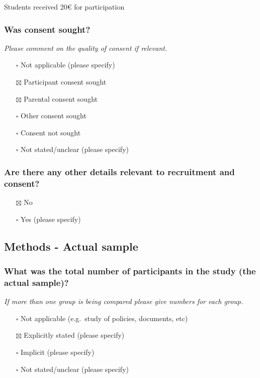\documentclass[
  doc, a4paper]{apa7}
\providecommand{\tightlist}{%
  \setlength{\itemsep}{0pt}\setlength{\parskip}{0pt}}
\begin{document}
Students received 20€ for participation

\subsubsection{Was consent sought?}\label{was-consent-sought}

\emph{Please comment on the quality of consent if relevant.}

\begin{itemize}
\tightlist
\item[$\square$]
  Not applicable (please specify)
\item[$\boxtimes$]
  Participant consent sought
\item[$\boxtimes$]
  Parental consent sought
\item[$\square$]
  Other consent sought
\item[$\square$]
  Consent not sought
\item[$\square$]
  Not stated/unclear (please specify)
\end{itemize}

\subsubsection{Are there any other details relevant to recruitment and consent?}\label{are-there-any-other-details-relevant-to-recruitment-and-consent}

\begin{itemize}
\tightlist
\item[$\boxtimes$]
  No
\item[$\square$]
  Yes (please specify)
\end{itemize}

\subsection{Methods - Actual sample}\label{methods---actual-sample}

\subsubsection{What was the total number of participants in the study (the actual sample)?}\label{what-was-the-total-number-of-participants-in-the-study-the-actual-sample}

\emph{If more than one group is being compared please give numbers for each group.}

\begin{itemize}
\tightlist
\item[$\square$]
  Not applicable (e.g.~study of policies, documents, etc)
\item[$\boxtimes$]
  Explicitly stated (please specify)
\item[$\square$]
  Implicit (please specify)
\item[$\square$]
  Not stated/unclear (please specify)
\end{itemize}
\end{document}
